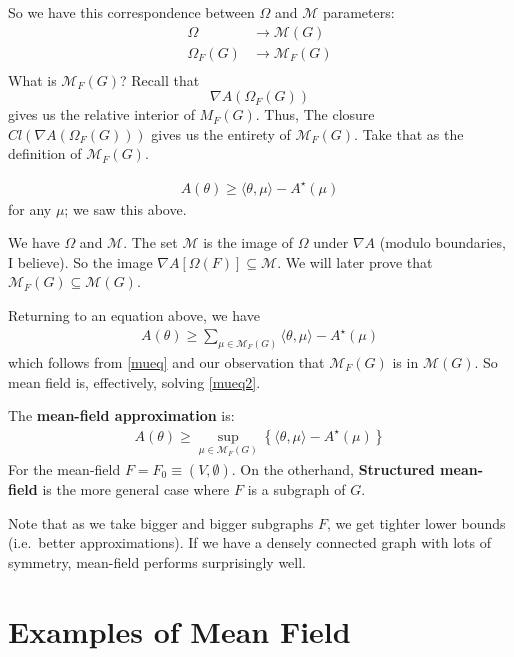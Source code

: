 \documentclass{article}
\newcommand{\M}{\mathcal{M}}
\begin{document}
So we have this correspondence between $\Omega$ and $\M$ parameters:
\begin{align*}
\Omega & \rightarrow  \M(G) \\
\Omega_F(G) & \rightarrow  \M_F(G) \\
\end{align*}
What is $\M_F(G)$?
Recall that
$$
\nabla A(\Omega_F(G))
$$
gives us the relative interior of $M_F(G)$.
Thus, The closure $Cl(\nabla A(\Omega_F(G)))$ gives us the entirety of $\M_F(G)$.
Take that as the definition of $\M_F(G)$.

\begin{align}
A(\theta)
\geq
\langle \theta,\mu\rangle - A^\star(\mu)
\label{mueq}
\end{align}
for any $\mu$; we saw this above.

We have $\Omega$ and $\M$.
The set $\M$ is the image of $\Omega$ under $\nabla A$ (modulo boundaries, I believe).
So the image $\nabla A[\Omega(F)] \subseteq \M$.
We will later prove that $\M_F(G) \subseteq \M(G)$.

Returning to an equation above, we have
\begin{align}
A(\theta)
\geq
\sum_{\mu\in \M_F(G)}
\langle \theta,\mu\rangle - A^\star(\mu)
\label{mueq2}
\end{align}
which follows from \eqref{mueq} and our observation that $\M_F(G)$ is in $\M(G)$.
So mean field is, effectively, solving \eqref{mueq2}.

The \textbf{mean-field approximation} is:
\begin{align}
A(\theta)
\geq
\sup_{\mu\in\M_F(G)}
\left\{
\langle
\theta, \mu\rangle
-
A^\star(\mu)
\right\}
\label{meanfieldeq}
\end{align}
For the mean-field $F = F_0\equiv (V,\emptyset)$.
On the otherhand, \textbf{Structured mean-field} is the more general
case where $F$ is a subgraph of $G$.

Note that as we take bigger and bigger subgraphs $F$, we get tighter lower bounds (i.e.\ better approximations).
If we have a densely connected graph with lots of symmetry, mean-field performs surprisingly well.

\section{Examples of Mean Field}
\end{document}
